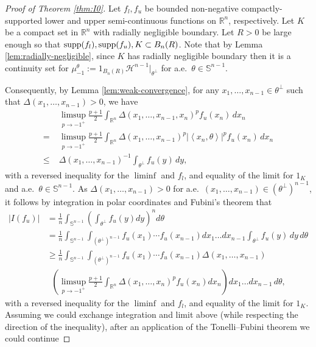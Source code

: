 \documentclass[11pt]{article}
\theoremstyle{definition}
\theoremstyle{proof}
\DeclareMathOperator{\+}{\mathop{\tilde{+}}}
\DeclareMathOperator{\supp}{\textnormal{supp}}
\newcommand{\abs}[1]{\left\vert#1\right\vert}
\newcommand{\brac}[1]{\left(#1\right)}
\newcommand{\scalar}[1]{\left \langle #1 \right \rangle}
\newcommand{\R}{\mathbb{R}}
\renewcommand{\S}{\mathbb{S}}
\renewcommand{\H}{\mathcal{H}}
\numberwithin{equation}{section}
\numberwithin{equation}{section}
\begin{document}
\begin{proof}[Proof of Theorem \ref{thm:I0}]
Let $f_l,f_u$ be bounded non-negative compactly-supported lower and upper semi-continuous functions on $\R^n$, respectively. Let $K$ be a compact set in $\R^n$ with radially negligible boundary. Let $R > 0$ be large enough so that $\supp(f_l),\supp(f_u) , K \subset B_n(R)$. 
Note that by Lemma \ref{lem:radially-negligible}, since $K$ has radially negligible boundary then it is a continuity set for $\mu_{-1}^{\theta} := 1_{B_n(R)} \H^{n-1}|_{\theta^{\perp}}$ for a.e.~$\theta \in \S^{n-1}$.

\smallskip
Consequently, by Lemma \ref{lem:weak-convergence}, for any $x_1,\ldots,x_{n-1} \in \theta^{\perp}$ such that $\Delta(x_1,\ldots,x_{n-1}) > 0$, we have
\begin{align*}
  & \; \limsup_{p \rightarrow -1^+} \frac{p+1}{2} \int_{\R^n} \Delta(x_1,\ldots,x_{n-1},x_n)^p f_u(x_n) \, dx_n \\
 =  & \; \limsup_{p \rightarrow -1^+} \frac{p+1}{2} \int_{\R^n} \Delta(x_1,\ldots,x_{n-1})^p \abs{\scalar{x_n,\theta}}^p f_u(x_n) \, dx_n \\
 \leq & \; \Delta(x_1,\ldots,x_{n-1})^{-1} \int_{\theta^{\perp}} f_u(y) \, dy ,
\end{align*}
with a reversed inequality for the $\liminf$ and $f_l$, and equality of the limit for $1_K$ and a.e.~$\theta \in \S^{n-1}$. As $\Delta(x_1,\ldots,x_{n-1}) > 0$ 
for a.e.~$(x_1,\ldots,x_{n-1}) \in (\theta^{\perp})^{n-1}$, it follows by integration in polar coordinates and Fubini's theorem that
\begin{align}
\nonumber  |I(f_u)| & = \frac{1}{n} \int_{\S^{n-1}} \brac{\int_{\theta^{\perp}} f_u(y) dy }^n d\theta \\
\nonumber  & = \frac{1}{n} \int_{\S^{n-1}} \int_{(\theta^{\perp})^{n-1}} f_u(x_1) \cdots f_u(x_{n-1}) dx_1 \ldots dx_{n-1} \int_{\theta^{\perp}} f_u(y) \, dy  \, d\theta \\
\label{eq:DCT1} & \geq  \frac{1}{n} \int_{\S^{n-1}} \int_{(\theta^{\perp})^{n-1}} f_u(x_1) \cdots f_u(x_{n-1})   \Delta(x_1,\ldots,x_{n-1}) \\
\nonumber & \;\; \brac{\limsup_{p \rightarrow -1^+} \frac{p+1}{2} \int_{\R^n} \Delta(x_1,\ldots,x_n)^p f_u(x_n) dx_n } dx_1 \ldots dx_{n-1} \, d\theta ,
\end{align}
with a reversed inequality for the $\liminf$ and $f_l$, and equality of the limit for $1_K$. Assuming we could exchange integration and limit above 
(while respecting the direction of the inequality), after an application of the Tonelli--Fubini theorem we could continue

\end{proof}
\end{document}
